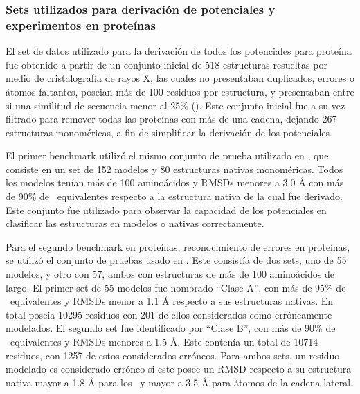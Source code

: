 \subsubsection{Sets utilizados para derivación de potenciales y experimentos en proteínas}
\par
El set de datos utilizado para la derivación de todos los potenciales para proteína fue obtenido a partir de un conjunto inicial de 518 estructuras resueltas por medio de cristalografía de rayos X, las cuales no presentaban duplicados, errores o átomos faltantes, poseian más de 100 residuos por estructura, y presentaban entre si una similitud de secuencia menor al 25\% (\cite{Ferrada2009}). 
Este conjunto inicial fue a su vez filtrado para remover todas las proteínas con más de una cadena, dejando 267 estructuras monoméricas, a fin de simplificar la derivación de los potenciales.
\par
El primer benchmark utilizó el mismo conjunto de prueba utilizado en \cite{Ferrada2007}, que consiste en un set de 152 modelos y 80 estructuras nativas monoméricas. 
Todos los modelos tenían más de 100 aminoácidos y RMSDs menores a 3.0 \si{\angstrom} con más de 90\% de \Ca\ equivalentes respecto a la estructura nativa de la cual fue derivado. 
Este conjunto fue utilizado para observar la capacidad de los potenciales en clasificar las estructuras en modelos o nativas correctamente.
\par
Para el segundo benchmark en proteínas, reconocimiento de errores en proteínas, se utilizó el conjunto de pruebas usado en \cite{Ferrada2009}.
Este consistía de dos sets, uno de 55 modelos, y otro con 57, ambos con estructuras de más de 100 aminoácidos de largo. 
El primer set de 55 modelos fue nombrado ``Clase A'', con más de 95\% de \Ca\ equivalentes y RMSDs menor a 1.1 \si{\angstrom} respecto a sus estructuras nativas. 
En total poseía 10295 residuos con 201 de ellos considerados como erróneamente modelados. 
El segundo set fue identificado por ``Clase B'', con más de 90\% de \Ca\ equivalentes y RMSDs menores a 1.5 \si{\angstrom}.
Este contenía un total de 10714 residuos, con 1257 de estos considerados erróneos. 
Para ambos sets, un residuo modelado es considerado erróneo si este posee un RMSD respecto a su estructura nativa mayor a 1.8 \si{\angstrom} para los \Ca\ y mayor a 3.5 \si{\angstrom} para átomos de la cadena lateral.
